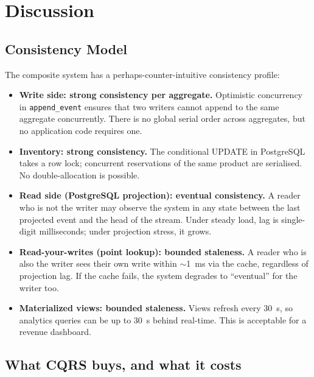 \documentclass[11pt,a4paper]{article}
\newcommand{\code}[1]{\texttt{\small #1}}
\begin{document}
\section{Discussion}

\subsection{Consistency Model}

The composite system has a perhaps-counter-intuitive consistency profile:

\begin{itemize}
  \item \textbf{Write side: strong consistency per aggregate.} Optimistic concurrency in \code{append\_event} ensures that two writers cannot append to the same aggregate concurrently. There is no global serial order across aggregates, but no application code requires one.
  \item \textbf{Inventory: strong consistency.} The conditional UPDATE in PostgreSQL takes a row lock; concurrent reservations of the same product are serialised. No double-allocation is possible.
  \item \textbf{Read side (PostgreSQL projection): eventual consistency.} A reader who is not the writer may observe the system in any state between the last projected event and the head of the stream. Under steady load, lag is single-digit milliseconds; under projection stress, it grows.
  \item \textbf{Read-your-writes (point lookup): bounded staleness.} A reader who is also the writer sees their own write within $\sim$1~ms via the cache, regardless of projection lag. If the cache fails, the system degrades to ``eventual'' for the writer too.
  \item \textbf{Materialized views: bounded staleness.} Views refresh every 30~s, so analytics queries can be up to 30~s behind real-time. This is acceptable for a revenue dashboard.
\end{itemize}

\subsection{What CQRS buys, and what it costs}
\end{document}
